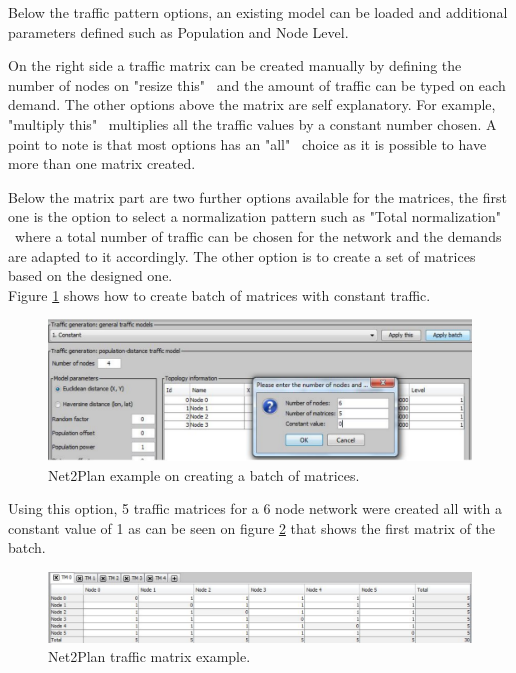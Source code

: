 	Below the traffic pattern options, an existing model can be loaded and additional parameters defined such as Population and Node Level.
	
	On the right side a traffic matrix can be created manually by defining the number of nodes on "resize this" \ and the amount of traffic can be typed on each demand. The other options above the matrix are self explanatory. For example, "multiply this" \ multiplies all the traffic values by a constant number chosen. A point to note is that most options has an "all" \ choice as it is possible to have more than one matrix created.
	
	Below the matrix part are two further options available for the matrices, the first one is the option to select a normalization pattern such as "Total normalization" \ where a total number of traffic can be chosen for the network and the demands are adapted to it accordingly. The other option is to create a set of matrices based on the designed one.\\
	
	Figure \ref{TrafficMatrixCreation} shows how to create batch of matrices with constant traffic.
	
	\begin{figure}[h!]
		\centering
		\includegraphics[width = 13cm]{TrafficMatrixCreation.pdf}
		\caption{Net2Plan example on creating a batch of matrices.}
		\label{TrafficMatrixCreation}
	\end{figure} 	
	
	Using this option, 5 traffic matrices for a 6 node network were created all with a constant value of 1 as can be seen on figure \ref{Net2Plan_matrix} that shows the first matrix of the batch.

	\begin{figure}[h!]
		\centering
		\includegraphics[width = 13cm]{Net2Plan_matrix.pdf}
		\caption{Net2Plan traffic matrix example.}
		\label{Net2Plan_matrix}
	\end{figure}
	
